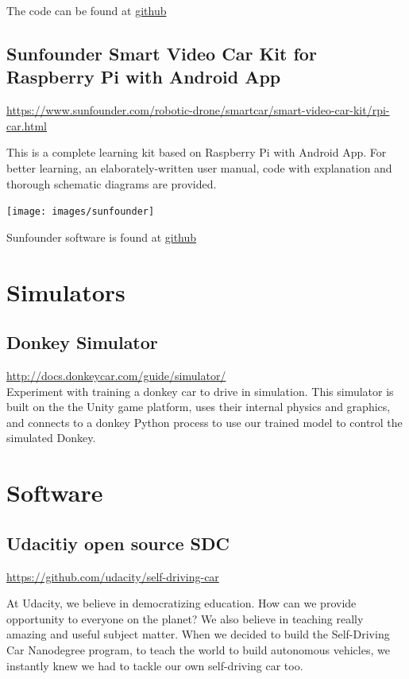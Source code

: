 \documentclass[]{book}
\begin{document}
The code can be found at
\href{https://github.com/wroscoe/donkey}{github}

\subsection{Sunfounder Smart Video Car Kit for Raspberry Pi with Android
App}\label{sunfounder-smart-video-car-kit-for-raspberry-pi-with-android-app}

\url{https://www.sunfounder.com/robotic-drone/smartcar/smart-video-car-kit/rpi-car.html}

This is a complete learning kit based on Raspberry Pi with Android App.
For better learning, an elaborately-written user manual, code with
explanation and thorough schematic diagrams are provided.

\texttt{[image: images/sunfounder]}

Sunfounder software is found at
\href{https://github.com/sunfounder/Sunfounder_Smart_Video_Car_Kit_for_RaspberryPi}{github}

\section{Simulators}\label{simulators}

\subsection{Donkey Simulator}\label{donkey-simulator}

\url{http://docs.donkeycar.com/guide/simulator/}\\
Experiment with training a donkey car to drive in simulation. This
simulator is built on the the Unity game platform, uses their internal
physics and graphics, and connects to a donkey Python process to use our
trained model to control the simulated Donkey.

\section{Software}\label{software}

\subsection{Udacitiy open source SDC}\label{udacitiy-open-source-sdc}

\url{https://github.com/udacity/self-driving-car}

At Udacity, we believe in democratizing education. How can we provide
opportunity to everyone on the planet? We also believe in teaching
really amazing and useful subject matter. When we decided to build the
Self-Driving Car Nanodegree program, to teach the world to build
autonomous vehicles, we instantly knew we had to tackle our own
self-driving car too.
\end{document}
